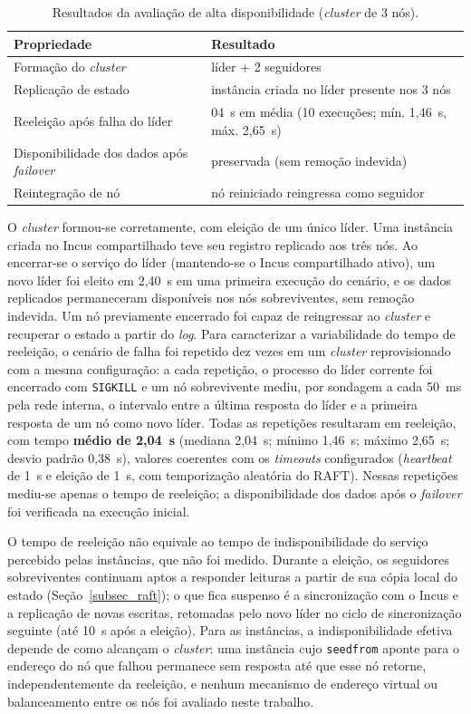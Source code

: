 \begin{table}[ht]
\centering
\caption{Resultados da avaliação de alta disponibilidade (\textit{cluster} de 3 nós).}
\label{tab:ha}
\begin{tabular}{>{\raggedright\arraybackslash}p{5.2cm} >{\raggedright\arraybackslash}p{7.4cm}}
\hline
\textbf{Propriedade} & \textbf{Resultado} \\
\hline
Formação do \textit{cluster} & 1 líder + 2 seguidores \\
Replicação de estado & instância criada no líder presente nos 3 nós \\
Reeleição após falha do líder & 2{,}04~s em média (10 execuções; mín. 1{,}46~s, máx. 2{,}65~s) \\
Disponibilidade dos dados após \textit{failover} & preservada (sem remoção indevida) \\
Reintegração de nó & nó reiniciado reingressa como seguidor \\
\hline
\end{tabular}
\end{table}

O \textit{cluster} formou-se corretamente, com eleição de um único líder. Uma instância criada no Incus compartilhado teve seu registro replicado aos três nós. Ao encerrar-se o serviço do líder (mantendo-se o Incus compartilhado ativo), um novo líder foi eleito em 2{,}40~s em uma primeira execução do cenário, e os dados replicados permaneceram disponíveis nos nós sobreviventes, sem remoção indevida. Um nó previamente encerrado foi capaz de reingressar ao \textit{cluster} e recuperar o estado a partir do \textit{log}. Para caracterizar a variabilidade do tempo de reeleição, o cenário de falha foi repetido dez vezes em um \textit{cluster} reprovisionado com a mesma configuração: a cada repetição, o processo do líder corrente foi encerrado com \texttt{SIGKILL} e um nó sobrevivente mediu, por sondagem a cada 50~ms pela rede interna, o intervalo entre a última resposta do líder e a primeira resposta de um nó como novo líder. Todas as repetições resultaram em reeleição, com tempo \textbf{médio de 2{,}04~s} (mediana 2{,}04~s; mínimo 1{,}46~s; máximo 2{,}65~s; desvio padrão 0{,}38~s), valores coerentes com os \textit{timeouts} configurados (\textit{heartbeat} de 1~s e eleição de 1~s, com temporização aleatória do RAFT). Nessas repetições mediu-se apenas o tempo de reeleição; a disponibilidade dos dados após o \textit{failover} foi verificada na execução inicial.

O tempo de reeleição não equivale ao tempo de indisponibilidade do serviço percebido pelas instâncias, que não foi medido. Durante a eleição, os seguidores sobreviventes continuam aptos a responder leituras a partir de sua cópia local do estado (Seção~\ref{subsec_raft}); o que fica suspenso é a sincronização com o Incus e a replicação de novas escritas, retomadas pelo novo líder no ciclo de sincronização seguinte (até 10~s após a eleição). Para as instâncias, a indisponibilidade efetiva depende de como alcançam o \textit{cluster}: uma instância cujo \texttt{seedfrom} aponte para o endereço do nó que falhou permanece sem resposta até que esse nó retorne, independentemente da reeleição, e nenhum mecanismo de endereço virtual ou balanceamento entre os nós foi avaliado neste trabalho.

